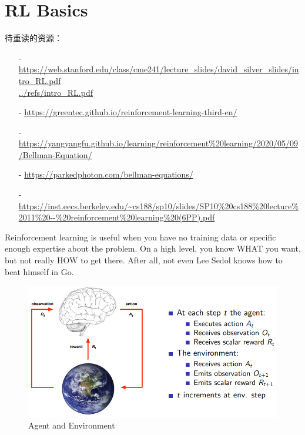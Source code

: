 
\chapter{RL Basics}\label{rl_basics}
待重读的资源：
\begin{itemize}
\setlength{\parskip}{0pt}
\item[-]
\url{https://web.stanford.edu/class/cme241/lecture_slides/david_silver_slides/intro_RL.pdf} \\
\url{../refs/intro_RL.pdf}

\item[-]
\url{https://greentec.github.io/reinforcement-learning-third-en/}

\item[-]
\url{https://yangyangfu.github.io/learning/reinforcement%20learning/2020/05/09/Bellman-Equation/}

\item[-]
\url{https://parkedphoton.com/bellman-equations/}

\item[-]
\url{https://inst.eecs.berkeley.edu/~cs188/sp10/slides/SP10%20cs188%20lecture%2011%20--%20reinforcement%20learning%20(6PP).pdf}

\end{itemize}


Reinforcement learning is useful when you have no training data or specific enough 
expertise about the problem. On a high level, you know WHAT you want, but not really 
HOW to get there. After all, not even Lee Sedol knows how to beat himself in Go.

\begin{figure}[h]
\centering
\includegraphics[scale=0.618]{pix/agent_n_env.png}
\caption{Agent and Environment}
\end{figure}

